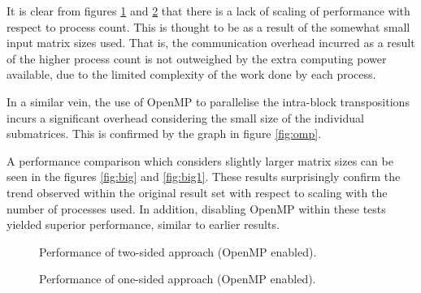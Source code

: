 \documentclass[journal,10pt,a4paper]{IEEEtran}
\begin{document}
It is clear from figures \ref{fig:2s} and \ref{fig:1s} that there is a lack of scaling of performance with respect to process count. This is thought to be as a result of the somewhat small input matrix sizes used. That is, the communication overhead incurred as a result of the higher process count is not outweighed by the extra computing power available, due to the limited complexity of the work done by each process. 


In a similar vein, the use of OpenMP to parallelise the intra-block transpositions incurs a significant overhead considering the small size of the individual submatrices. This is confirmed by the graph in figure \ref{fig:omp}.



A performance comparison which considers slightly larger matrix sizes can be seen in the figures \ref{fig:big} and \ref{fig:big1}. These results surprisingly confirm the trend observed within the original result set with respect to scaling with the number of processes used. In addition, disabling OpenMP within these tests yielded superior performance, similar to earlier results.

\vspace*{0.5cm}

\begin{figure}[H]
    \centering
    \caption{Performance of two-sided approach (OpenMP enabled).}
    \label{fig:2s}
\end{figure}

\newpage


\begin{figure}[H]
    \centering
    \caption{Performance of one-sided approach (OpenMP enabled).}
    \label{fig:1s}
\end{figure}
\end{document}
